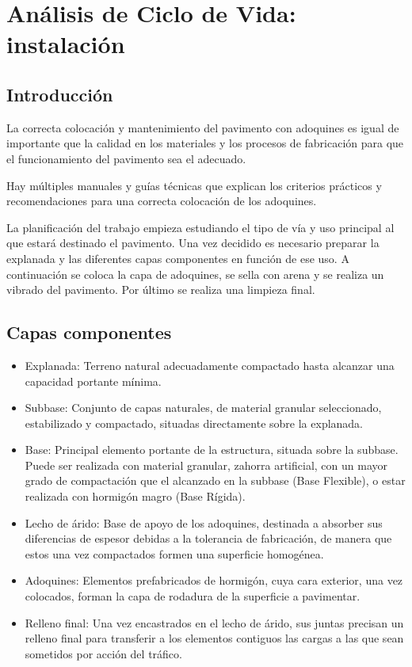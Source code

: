 \chapter{Análisis de Ciclo de Vida: instalación}
\section{Introducción}
La correcta colocación y mantenimiento del pavimento con adoquines es igual de importante que la calidad en los materiales y los procesos de fabricación \cite{euroadoquinc} para que el funcionamiento del pavimento sea el adecuado.

Hay múltiples manuales y guías técnicas que explican los criterios prácticos y recomendaciones para una correcta colocación de los adoquines.

La planificación del trabajo empieza estudiando el tipo de vía y uso principal al que estará destinado el pavimento. Una vez decidido es necesario preparar la explanada y las diferentes capas componentes en función de ese uso. A continuación se coloca la capa de adoquines, se sella con arena y se realiza un vibrado del pavimento. Por último se realiza una limpieza final.

\section{Capas componentes}

\begin{itemize}
\item Explanada: Terreno natural adecuadamente compactado hasta alcanzar una capacidad portante mínima.
\item Subbase: Conjunto de capas naturales, de material granular seleccionado, estabilizado y compactado, situadas directamente sobre la explanada.
\item Base: Principal elemento portante de la estructura, situada sobre la subbase. Puede ser realizada con material granular, zahorra artificial, con un mayor grado de compactación que el alcanzado en la subbase (Base Flexible), o estar realizada con hormigón magro (Base Rígida).
\item Lecho de árido: Base de apoyo de los adoquines, destinada a absorber sus diferencias de espesor debidas a la tolerancia de fabricación, de manera que estos una vez compactados formen una superficie homogénea.
\item Adoquines: Elementos prefabricados de hormigón, cuya cara exterior, una vez colocados, forman la capa de rodadura de la superficie a pavimentar.
\item Relleno final: Una vez encastrados en el lecho de árido, sus juntas precisan un relleno final para transferir a los elementos contiguos las cargas a las que sean sometidos por acción del tráfico.
\end{itemize}

